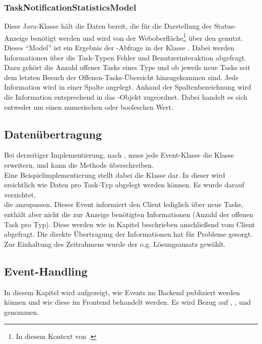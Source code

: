 \subsubsection{TaskNotificationStatisticsModel}
\label{subsub:TaskNotificationStatisticsModel}
Diese Java-Klasse hält die Daten bereit, die für die Darstellung der Status-Anzeige benötigt werden
und wird von der Weboberfläche\footnote{In diesem Kontext von .} über den
 genutzt. Dieses "`Model"' ist ein Ergebnis der -Abfrage in
 der Klasse . Dabei werden
Informationen über die Task-Typen Fehler und Benutzerinteraktion abgefragt. Dazu gehört die Anzahl offener Tasks eines Typs und
ob jeweils neue Tasks seit dem letzten Besuch der Offenen-Tasks-Übersicht hinzugekommen sind. Jede Information wird in einer
Spalte angelegt. Anhand der Spaltenbezeichnung wird die Information entsprechend in das
-Objekt zugeordnet. Dabei handelt es sich entweder um einen numerischen oder booleschen
Wert.


\subsection{Datenübertragung}
\label{sub:Datenübertragung}
Bei derzeitiger Implementierung, nach , muss jede Event-Klasse die Klasse
 erweitern, und kann \ggfs die Methode  überschreiben.\\
Eine Beispielimplementierung stellt dabei die Klasse  dar. In dieser wird ersichtlich wie Daten
pro Task-Typ abgelegt werden können. Es wurde darauf verzichtet, \\die {} anzupassen. Dieses
Event informiert den Client lediglich über neue Tasks, enthält aber nicht die zur Anzeige benötigten Informationen (Anzahl der offenen
Task pro Typ). Diese werden wie in Kapitel  beschrieben anschließend vom Client abgefragt.
Die direkte Übertragung der Informationen hat für Probleme gesorgt. Zur Einhaltung des Zeitrahmens wurde der o.g. Lösungsansatz
gewählt.


\subsection{Event-Handling}
\label{sub:Event-Handling}
In diesem Kapitel wird aufgezeigt, wie Events im Backend publiziert werden können und wie diese im Frontend behandelt werden. Es
wird Bezug auf , ,  und
 genommen.

